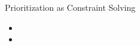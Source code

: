 \begin{Slide}{Prioritization as Constraint Solving}

\begin{itemize}
\item {}
\item {}







\end{itemize}
\end{Slide}